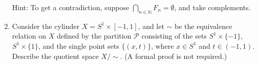 \documentclass[12pt]{article}
\newcommand{\points}[1]{\marginpar{\hspace{24pt}[#1]}}
\newcommand{\N}{\mathbb{N}}
\begin{document}
\begin{enumerate}
Hint: To get a contradiction, suppose $\bigcap_{n\in\N}F_n = \emptyset$, and take complements.

 \vspace{4.5in}

 \item Consider the cylinder $X=S^1\times [-1,1]$, and let $\sim$ be the equivalence relation on $X$ defined by the partition  $\mathcal{P}$ consisting of the sets $S^1\times\{-1\}$, $S^1\times\{1\}$, and the single point sets $\{(x,t)\}$, where $x\in S^1$ and $t\in (-1,1)$. Describe the quotient space $X/\sim$. \points{4} (A formal proof is not required.)


\end{enumerate}
\end{document}
